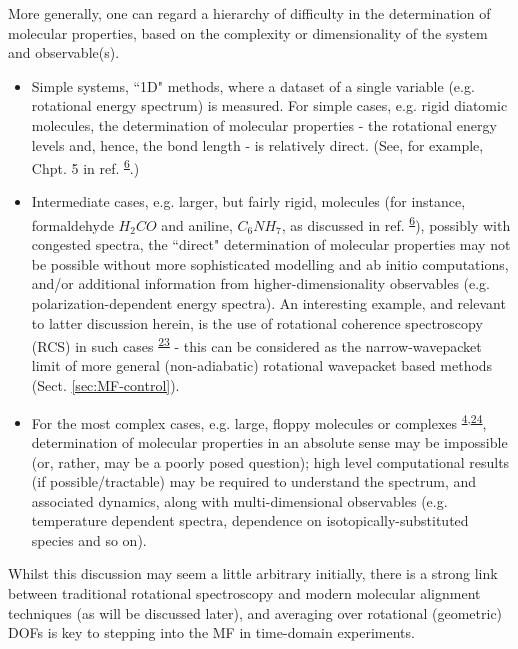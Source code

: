 \documentclass[10pt]{article}
\begin{document}

More generally, one can regard a hierarchy of difficulty in the determination of molecular properties, based on the complexity or dimensionality of the system and observable(s).
\begin{itemize}
\item Simple systems, ``1D" methods, where a dataset of a single variable (e.g. rotational energy spectrum) is measured. For simple cases, e.g. rigid diatomic molecules, the determination of molecular properties - the rotational energy levels and, hence, the bond length - is relatively direct. (See, for example, Chpt. 5 in ref. \textsuperscript{\hyperref[csl:6]{6}}.) %
\item Intermediate cases, e.g. larger, but fairly rigid, molecules (for instance, formaldehyde $H_2CO$ and aniline, $C_6NH_7$, as discussed in ref. \textsuperscript{\hyperref[csl:6]{6}}), possibly with congested spectra, the ``direct" determination of molecular properties may not be possible without more sophisticated modelling and ab initio computations, and/or additional information from higher-dimensionality observables (e.g. polarization-dependent energy spectra). An interesting example, and relevant to latter discussion herein, is the use of rotational coherence spectroscopy (RCS) in such cases \textsuperscript{\hyperref[csl:23]{23}} - this can be considered as the narrow-wavepacket limit of more general (non-adiabatic) rotational wavepacket based methods (Sect. \ref{sec:MF-control}).
\item For the most complex cases, e.g. large, floppy molecules or complexes \textsuperscript{\hyperref[csl:4]{4},\hyperref[csl:24]{24}}, determination of molecular properties in an absolute sense may be impossible (or, rather, may be a poorly posed question); high level computational results (if possible/tractable) may be required to understand the spectrum, and associated dynamics, along with multi-dimensional observables (e.g. temperature dependent spectra, dependence on isotopically-substituted species and so on).
\end{itemize}    

Whilst this discussion may seem a little arbitrary initially, there is a strong link between traditional rotational spectroscopy and modern molecular alignment techniques (as will be discussed later), and averaging over rotational (geometric) DOFs is key to stepping into the MF in time-domain experiments.
\end{document}
